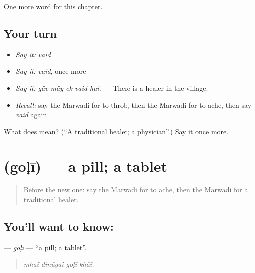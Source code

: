 \begin{grammarlens}[title={What you've built}]
One more word for this chapter.
\end{grammarlens}

\subsection*{Your turn}
\begin{itemize}
\raggedright
  \item \emph{Say it:} \emph{vaid}
  \item \emph{Say it:} \emph{vaid}, once more
  \item \emph{Say it:} \emph{gā̃v mā̃y ek vaid hai.} — There is a healer in the village.
  \item \emph{Recall:} say the Marwadi for to throb, then the Marwadi for to ache, then say \emph{vaid} again
\end{itemize}

\begin{tcolorbox}[breakable,colback=teal!4,colframe=teal!35!black,title={Before you move on}]
What does  mean? (\textquotedblleft{}A traditional healer; a physician\textquotedblright{}.) Say it once more.
\end{tcolorbox}
\section[\texorpdfstring{\mw{गोळी} (goḷī)}{गोळी (goḷī)}]{ (goḷī) — a pill; a tablet}

\label{lesson:MW-C254-goli}



\begin{quote}
Before the new one: say the Marwadi for to ache, then the Marwadi for a traditional healer.
\end{quote}

\subsection*{You'll want to know: }
\textbf{} — \emph{goḷī} — \textquotedblleft{}a pill; a tablet\textquotedblright{}.

\begin{quote}
   
\end{quote}

\begin{quote}
\emph{mhaĩ dinūgai goḷī khāī.}
\end{quote}

